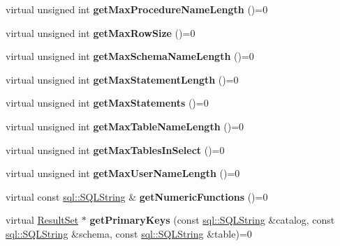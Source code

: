 \begin{DoxyCompactItemize}
virtual unsigned int {\bfseries get\+Max\+Procedure\+Name\+Length} ()=0
\item 
\hypertarget{classsql_1_1_database_meta_data_ad3969ced5c3588235ea1b1d0abb2f54e}{}\label{classsql_1_1_database_meta_data_ad3969ced5c3588235ea1b1d0abb2f54e} 
virtual unsigned int {\bfseries get\+Max\+Row\+Size} ()=0
\item 
\hypertarget{classsql_1_1_database_meta_data_a6402d54f7ab4aab9fb6a0fb0f4f789f9}{}\label{classsql_1_1_database_meta_data_a6402d54f7ab4aab9fb6a0fb0f4f789f9} 
virtual unsigned int {\bfseries get\+Max\+Schema\+Name\+Length} ()=0
\item 
\hypertarget{classsql_1_1_database_meta_data_a03e2eeff7cb8ba131f883001ebfc28e4}{}\label{classsql_1_1_database_meta_data_a03e2eeff7cb8ba131f883001ebfc28e4} 
virtual unsigned int {\bfseries get\+Max\+Statement\+Length} ()=0
\item 
\hypertarget{classsql_1_1_database_meta_data_ac70729ade189e82f16d14ab816eb0c68}{}\label{classsql_1_1_database_meta_data_ac70729ade189e82f16d14ab816eb0c68} 
virtual unsigned int {\bfseries get\+Max\+Statements} ()=0
\item 
\hypertarget{classsql_1_1_database_meta_data_a0de009aca4a8c89a424e04c84598f5c1}{}\label{classsql_1_1_database_meta_data_a0de009aca4a8c89a424e04c84598f5c1} 
virtual unsigned int {\bfseries get\+Max\+Table\+Name\+Length} ()=0
\item 
\hypertarget{classsql_1_1_database_meta_data_a3b0131ea0ae4bb88c484555b4b02a305}{}\label{classsql_1_1_database_meta_data_a3b0131ea0ae4bb88c484555b4b02a305} 
virtual unsigned int {\bfseries get\+Max\+Tables\+In\+Select} ()=0
\item 
\hypertarget{classsql_1_1_database_meta_data_ac53ea52db09abf98b0ef4334a5854ff1}{}\label{classsql_1_1_database_meta_data_ac53ea52db09abf98b0ef4334a5854ff1} 
virtual unsigned int {\bfseries get\+Max\+User\+Name\+Length} ()=0
\item 
\hypertarget{classsql_1_1_database_meta_data_a14b53a06afac6626f0b1bfce43109df7}{}\label{classsql_1_1_database_meta_data_a14b53a06afac6626f0b1bfce43109df7} 
virtual const \hyperlink{classsql_1_1_s_q_l_string}{sql\+::\+S\+Q\+L\+String} \& {\bfseries get\+Numeric\+Functions} ()=0
\item 
\hypertarget{classsql_1_1_database_meta_data_add967db3b1fe2defafbdbc26bf3bd35a}{}\label{classsql_1_1_database_meta_data_add967db3b1fe2defafbdbc26bf3bd35a} 
virtual \hyperlink{classsql_1_1_result_set}{Result\+Set} $\ast$ {\bfseries get\+Primary\+Keys} (const \hyperlink{classsql_1_1_s_q_l_string}{sql\+::\+S\+Q\+L\+String} \&catalog, const \hyperlink{classsql_1_1_s_q_l_string}{sql\+::\+S\+Q\+L\+String} \&schema, const \hyperlink{classsql_1_1_s_q_l_string}{sql\+::\+S\+Q\+L\+String} \&table)=0

\end{DoxyCompactItemize}
